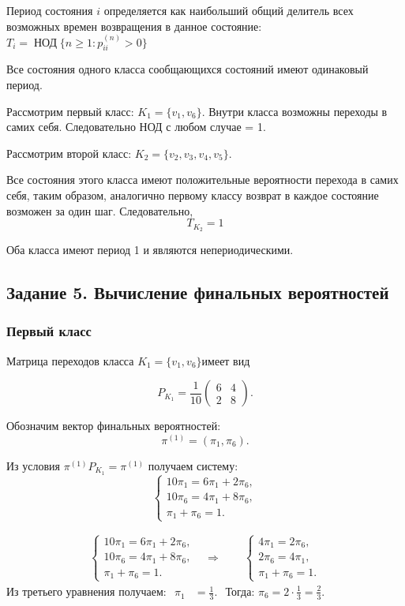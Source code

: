 \documentclass[a4paper, final]{article}
\begin{document}
	Период состояния $i$ определяется как наибольший
	общий делитель всех возможных времен возвращения
	в данное состояние:
	$	T_i=\operatorname{НОД}
	\{n\geq 1:p_{ii}^{(n)}>0\}$
	
	Все состояния одного класса сообщающихся
	состояний имеют одинаковый период.
	
	Рассмотрим первый класс:
$
	K_1=\{v_1,v_6\}.
$
	Внутри класса возможны переходы в самих себя. Следовательно НОД с любом случае = 1.
	
	Рассмотрим второй класс:
$
	K_2=\{v_2,v_3,v_4,v_5\}.
$
	
	Все состояния этого класса имеют положительные
	вероятности перехода в самих себя, таким образом, аналогично первому классу возврат в каждое состояние
	возможен за один шаг. Следовательно,
	\[
	{T_{K_2}=1}
	\]
	
	Оба класса имеют период 1 и являются
	непериодическими.
	
	\subsection*{Задание 5. Вычисление финальных вероятностей}
	\subsubsection*{Первый класс}
	Матрица переходов класса $
	K_1=\{v_1,v_6\} 
	$имеет вид

	\[
	P_{K_1}=\frac1{10}
	\begin{pmatrix}
		6&4\\
		2&8
	\end{pmatrix}.
	\]
	
	Обозначим вектор финальных вероятностей:
	\[
	\pi^{(1)}=(\pi_1,\pi_6).
	\]
	
	Из условия $\pi^{(1)}P_{K_1}=\pi^{(1)}$
	получаем систему:
	\[
	\begin{cases}
		10\pi_1=6\pi_1+2\pi_6,\\
		10\pi_6=4\pi_1+8\pi_6,\\
		\pi_1+\pi_6=1.
	\end{cases}
	\]
	
	\[
	\begin{aligned}
		\begin{cases}
			10\pi_1=6\pi_1+2\pi_6,\\
			10\pi_6=4\pi_1+8\pi_6,\\
			\pi_1+\pi_6=1.
		\end{cases}
		&\Rightarrow\qquad
		\begin{cases}
			4\pi_1=2\pi_6,\\
			2\pi_6=4\pi_1,\\
			\pi_1+\pi_6=1.
		\end{cases}
	\end{aligned}
	\]
Из третьего уравнения получаем:
	$
	\begin{aligned}
		\pi_1&=\frac13.
	\end{aligned}
$	Тогда:
$\displaystyle
\pi_6=2\cdot\frac13=\frac23.
$ 
	
\end{document}
